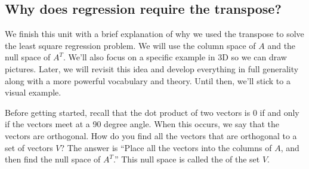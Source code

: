 \subsection{Why does regression require the transpose?}
We finish this unit with a brief explanation of why we used the transpose to solve the least square regression problem.  We will use the column space of $A$ and the null space of $A^T$. We'll also focus on a specific example in 3D so we can draw pictures.  Later,  we will revisit this idea and develop everything in full generality along with a more powerful vocabulary and theory.  Until then, we'll stick to a visual example.

%
Before getting started, recall that the dot product of two vectors is 0 if and only if the vectors meet at a 90 degree angle. When this occurs, we say that the vectors are orthogonal.
How do you find all the vectors that are orthogonal to a set of vectors $V$? The answer is ``Place all the vectors into the columns of $A$, and then find the null space of $A^T$.'' This null space is called the  of the set $V$. 
%

